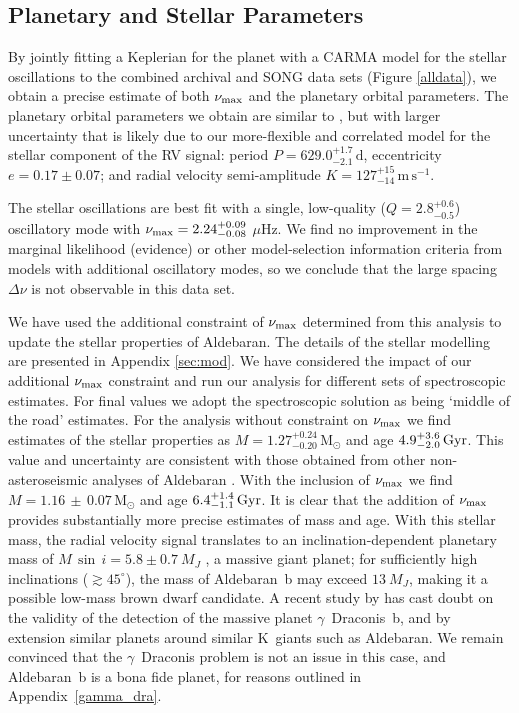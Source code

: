 \documentclass[modern]{aastex61}
\newcommand{\numax}{\mbox{$\nu_{\rm max}$}\xspace}
\newcommand{\muHz}{\mbox{$\mu$Hz}\xspace}
\newcommand{\twosidedrange}[3]{\ensuremath{#1^{+#2}_{-#3}}}
\newcommand{\CombinedQRange}{\twosidedrange{2.8}{0.6}{0.5}}
\newcommand{\PeriodRange}{\twosidedrange{629.0}{1.7}{2.1}}
\newcommand{\EccentricityRange}{0.17\pm0.07} %
\newcommand{\PlanetRVAmpRange}{\twosidedrange{127}{15}{14}}
\begin{document}
\subsection{Planetary and Stellar Parameters}
\label{sec:planet-star-parameters}

By jointly fitting a Keplerian for the planet with a CARMA model for the stellar
oscillations to the combined archival and SONG data sets (Figure \ref{alldata}),
we obtain a precise estimate of both \numax and the planetary orbital
parameters. The planetary orbital parameters we obtain are similar to
\citet{Hatzes2015}, but with larger uncertainty that is likely due to our
more-flexible and correlated model for the stellar component of the RV signal:
period $P = \PeriodRange{} \, \mathrm{d}$,  eccentricity $e =
\EccentricityRange{}$; and radial velocity semi-amplitude $K =
\PlanetRVAmpRange{} \, \mathrm{m}\, \mathrm{s}^{-1}$.

The stellar oscillations are best fit with a single, low-quality ($Q =
\CombinedQRange{}$) oscillatory mode with $\numax = 2.24^{+ 0.09}_{- 0.08}$
\muHz.  We find no improvement in the marginal likelihood (evidence) or other
model-selection information criteria \citep{Gelman2013} from models with
additional oscillatory modes, so we conclude that the large spacing $\Delta\nu$
is not observable in this data set.

We have used the additional constraint of \numax determined from this analysis
to update the stellar properties of Aldebaran.  The details of the stellar
modelling are presented in Appendix \ref{sec:mod}.  We have considered the
impact of our additional \numax constraint and run our analysis for different
sets of spectroscopic estimates.  For final values we adopt the
\citet{2012Sheffield} spectroscopic solution as being `middle of the road'
estimates.  For the analysis without constraint on \numax we find estimates of
the stellar properties as $M = 1.27^{+0.24}_{-0.20} \, \mathrm{M_{\odot}}$ and
age $4.9^{+3.6}_{-2.0} \, \rm Gyr$.  This value and uncertainty are consistent
with those obtained from other non-asteroseismic analyses of Aldebaran
\cite[e.g.][]{Abia2012,Hatzes2015}. With the inclusion of \numax we find $M = 1.16\, \pm
\, {0.07} \, \mathrm{M_{\odot}}$ and age $6.4^{+1.4}_{-1.1} \, \rm Gyr$.  It is
clear that the addition of \numax provides substantially more precise estimates
of mass and age. With this stellar mass, the radial velocity signal translates
to an inclination-dependent planetary mass of $M\,\sin\,{i} = 5.8 \pm 0.7~M_J$
\citep[Equation~1]{Torres2008}, a massive giant planet; for sufficiently high
inclinations ($\gtrsim 45^\circ$), the mass of Aldebaran~b may exceed $13~M_J$,
making it a possible low-mass brown dwarf candidate. A recent study by
\citet{2018arXiv180105239H} has cast doubt on the validity of the detection of
the massive planet $\gamma$~Draconis~b, and by extension similar planets around
similar K~giants such as Aldebaran. We remain convinced that the
$\gamma$~Draconis problem is not an issue in this case, and Aldebaran~b is a
bona fide planet, for reasons outlined in Appendix~\ref{gamma_dra}.
\end{document}
